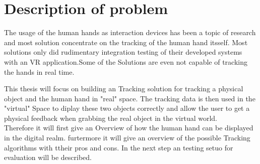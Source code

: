 \chapter{Description of problem}

The usage of the human hands as interaction devices has been a topic of research and most solution concentrate on the tracking of the human hand itsself. Most solutions only did rudimentary integration testing of their developed systems with an VR application.Some of the Solutions are even not capable of tracking the hands in real time.

This thesis will focus on building an Tracking solution for tracking  a physical object and the human hand in "real" space. The tracking data is then used in the "virtual" Space to diplay these two objects correctly and allow the user to get a physical feedback when grabbing the real object in the virtual world.\\
Therefore it will first give an Overview of how the human hand can be displayed in the digital realm. furtermore it will give an overview of the possible Tracking algorithms with ttheir pros and cons.
In the next step an testing setuo for evaluation will be described.




